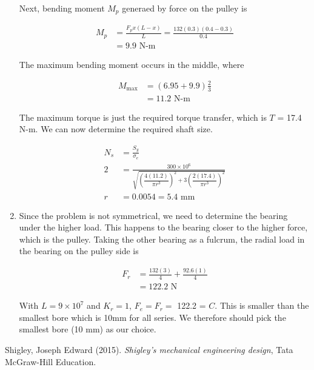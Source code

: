 \documentclass[a4paper,openany,svgnames]{kaobook}
\begin{document}
\begin{enumerate}
Next, bending moment \(M_{p}\) generaed by force on the pulley is

\begin{align*}
     M_{p} &= \frac{F_{p}x(L-x)}{L} = \frac{132(0.3)(0.4-0.3)}{0.4} \\
           &= 9.9 \text{ N-m}
   \end{align*}

The maximum bending moment occurs in the middle, where

\begin{align*}
     M_{\max} &= (6.95 + 9.9)\frac{2}{3} \\
              &= 11.2 \text{ N-m}
   \end{align*}

The maximum torque is just the required torque transfer, which is
\(T\) = 17.4 N-m. We can now determine the required shaft size.

\begin{align}
  N_{s} &= \frac{S_{y}}{\sigma_{e}} \\
  2 &= \frac{300 \times 10^{6}}{\sqrt{ \left( \dfrac{4(11.2)}{\pi r^{3}} \right)^{2} + 3 \left( \dfrac{2(17.4)}{\pi r^{3}} \right)^{2} }} \\
  r &= 0.0054 = 5.4 \text{ mm}
\end{align}

\item Since the problem is not symmetrical, we need to determine the bearing under the higher load. This happens to the bearing closer to the higher force, which is the pulley. Taking the other bearing as a fulcrum, the radial load in the bearing on the pulley side is

\begin{align*}
     F_{r} &= \frac{132(3)}{4} + \frac{92.6(1)}{4} \\
           &= 122.2 \text{ N}
   \end{align*}

With \(L = 9 \times 10^{7}\) and \(K_{r} = 1\), \(F_{e} = F_{r} =\) 122.2 = \(C\). This is smaller than the smallest bore which is 10mm for all series. We therefore should pick the smallest
bore (10 mm) as our choice.
\end{enumerate}

\backmatter

\noindent
Shigley, Joseph Edward (2015). \emph{Shigley's mechanical engineering design}, Tata McGraw-Hill Education.
\end{document}
